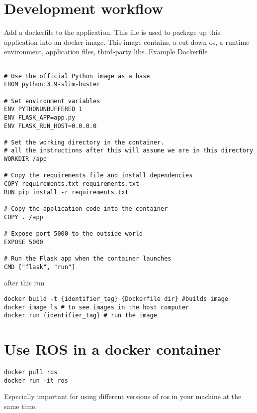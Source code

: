 \documentclass{article}
\begin{document}
\section{Development workflow}
Add a dockerfile to the application. This file is used to package up this application into an docker image. This image contains, a cut-down os, a runtime environment, application files, third-party libs. Example Dockerfile
\begin{verbatim}

# Use the official Python image as a base
FROM python:3.9-slim-buster

# Set environment variables
ENV PYTHONUNBUFFERED 1
ENV FLASK_APP=app.py
ENV FLASK_RUN_HOST=0.0.0.0

# Set the working directory in the container.
# all the instructions after this will assume we are in this directory
WORKDIR /app

# Copy the requirements file and install dependencies
COPY requirements.txt requirements.txt
RUN pip install -r requirements.txt

# Copy the application code into the container
COPY . /app

# Expose port 5000 to the outside world
EXPOSE 5000

# Run the Flask app when the container launches
CMD ["flask", "run"]

\end{verbatim}

after this run
\begin{verbatim}
docker build -t {identifier_tag} {Dockerfile dir} #builds image
docker image ls # to see images in the host computer
docker run {identifier_tag} # run the image
 \end{verbatim}
 
 \section{Use ROS in a docker container}
 \begin{verbatim}
docker pull ros
docker run -it ros
 \end{verbatim}
 Especially important for using different versions of ros in your machine at the same time. 
\end{document}
